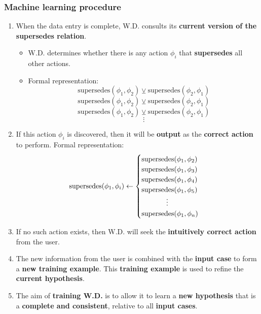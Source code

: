 \documentclass[11pt]{article}
\begin{document}
\subsubsection{Machine learning procedure}
\label{sec:orgf3df93b}
\begin{enumerate}
\item When the data entry is complete, W.D. consults its \textbf{current version of the supersedes relation}.
\begin{itemize}
\item W.D. determines whether there is any action \(\phi_i\) that \textbf{supersedes} all other actions.
\item Formal representation:
\[\text{supersedes}(\phi_1, \phi_2) \veebar \text{supersedes}(\phi_2 , \phi_1)\]
\[\text{supersedes}(\phi_1, \phi_2) \veebar \text{supersedes}(\phi_2 , \phi_1)\]
\[\text{supersedes}(\phi_1, \phi_2) \veebar \text{supersedes}(\phi_2 , \phi_1)\]
\[\vdots\]
\end{itemize}
\item If this action \(\phi_i\) is discovered, then it will be \textbf{output} as the \textbf{correct action} to perform.
Formal representation:
\begin{displaymath}
\text{supersedes}(\phi_1, \phi_i) \leftarrow \begin{cases}
\text{supersedes}(\phi_1, \phi_2) \\
\text{supersedes}(\phi_1, \phi_3) \\
\text{supersedes}(\phi_1, \phi_4) \\
\text{supersedes}(\phi_1, \phi_5) \\
\hspace*{3.5em} \vdots \\
\text{supersedes}(\phi_1, \phi_n) \\
\end{cases}
\end{displaymath}
\item If no such action exists, then W.D. will seek the \textbf{intuitively correct action} from the user.
\item The new information from the user is combined with the \textbf{input case} to form a \textbf{new training example}. This \textbf{training example} is used to refine the \textbf{current hypothesis}.
\item The aim of \textbf{training W.D.} is to allow it to learn a \textbf{new hypothesis} that is a \textbf{complete and consistent}, relative to all \textbf{input cases}.
\end{enumerate}
\end{document}
